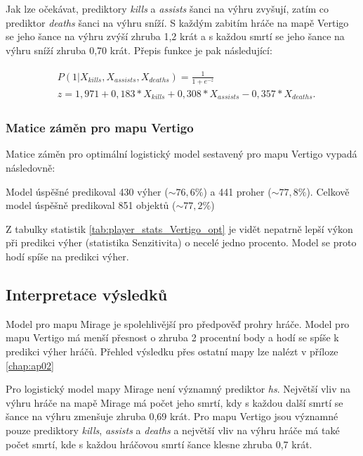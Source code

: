 

{\color{red}
Jak lze očekávat, prediktory \textit{kills} a \textit{assists} šanci na výhru zvyšují, zatím co prediktor \textit{deaths} šanci na výhru sníží. S každým zabitím hráče
na mapě Vertigo se jeho šance na výhru zvýší zhruba 1,2 krát a s každou smrtí se jeho šance na výhru sníží zhruba 0,70 krát.
}
Přepis funkce je pak následující:

\begin{align}
    \begin{split}
        &P(1 | X_{kills}, X_{assists}, X_{deaths}) = \frac{1}{1 + e^{-z}} \\
        &z = 1,971 + 0,183*X_{kills} + 0,308*X_{assists} - 0,357*X_{deaths}.
    \end{split}
\end{align}

\subsubsection{Matice záměn pro mapu Vertigo}
Matice záměn pro 
{\color{red}
optimální
}
logistický model sestavený pro mapu Vertigo
{\color{red}
vypadá následovně:
}



Model úspěšné predikoval 430 výher
{\color{red}
($\sim 76,6\%$)
}
a 441 proher 
{\color{red}
($\sim 77,8\%$). Celkově model úspěšně predikoval 851 objektů ($\sim 77,2\%$)
}



Z tabulky statistik \ref{tab:player_stats_Vertigo_opt} je vidět nepatrně lepší výkon při predikci výher (statistika Senzitivita) o necelé jedno procento.
Model se proto hodí spíše na predikci výher.

\subsection{Interpretace výsledků}
Model pro mapu Mirage je spolehlivější pro předpověď prohry hráče. Model pro mapu Vertigo má menší přesnost o zhruba 
2 procentní body a hodí se spíše k predikci výher hráčů.
{\color{red}
Přehled výsledku přes ostatní mapy lze nalézt v příloze \ref{chap:ap02}
}

Pro logistický model mapy Mirage není významný prediktor \textit{hs}. Největší vliv na výhru hráče na mapě Mirage má počet jeho smrtí, kdy s každou další smrtí se šance
na výhru zmenšuje zhruba 0,69 krát. Pro mapu Vertigo jsou významné pouze prediktory \textit{kills}, \textit{assists} a \textit{deaths} a největší vliv na výhru hráče
{\color{red}
má také počet smrtí, kde s každou hráčovou smrtí šance klesne zhruba 0,7 krát.
}

